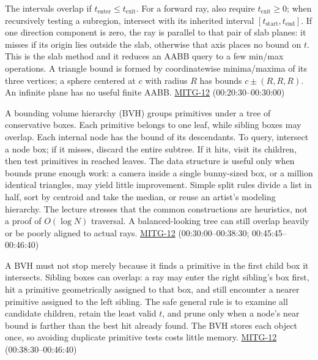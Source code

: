 The intervals overlap if \(t_{\mathrm{enter}}\leq t_{\mathrm{exit}}\). For a forward ray, also require \(t_{\mathrm{exit}}\geq0\); when recursively testing a subregion, intersect with its inherited interval \([t_{\mathrm{start}},t_{\mathrm{end}}]\). If one direction component is zero, the ray is parallel to that pair of slab planes: it misses if its origin lies outside the slab, otherwise that axis places no bound on \(t\). This is the slab method and it reduces an AABB query to a few min/max operations. A triangle bound is formed by coordinatewise minima/maxima of its three vertices; a sphere centered at \(c\) with radius \(R\) has bounds \(c\pm(R,R,R)\). An infinite plane has no useful finite AABB. \hyperref[04-visual-computing-ii-ch036]{MITG-12} (00:20:30--00:30:00)

A bounding volume hierarchy (BVH) groups primitives under a tree of conservative boxes. Each primitive belongs to one leaf, while sibling boxes may overlap. Each internal node has the bound of its descendants. To query, intersect a node box; if it misses, discard the entire subtree. If it hits, visit its children, then test primitives in reached leaves. The data structure is useful only when bounds prune enough work: a camera inside a single bunny-sized box, or a million identical triangles, may yield little improvement. Simple split rules divide a list in half, sort by centroid and take the median, or reuse an artist's modeling hierarchy. The lecture stresses that the common constructions are heuristics, not a proof of \(O(\log N)\) traversal. A balanced-looking tree can still overlap heavily or be poorly aligned to actual rays. \hyperref[04-visual-computing-ii-ch036]{MITG-12} (00:30:00--00:38:30; 00:45:45--00:46:40)

A BVH must not stop merely because it finds a primitive in the first child box it intersects. Sibling boxes can overlap: a ray may enter the right sibling's box first, hit a primitive geometrically assigned to that box, and still encounter a nearer primitive assigned to the left sibling. The safe general rule is to examine all candidate children, retain the least valid \(t\), and prune only when a node's near bound is farther than the best hit already found. The BVH stores each object once, so avoiding duplicate primitive tests costs little memory. \hyperref[04-visual-computing-ii-ch036]{MITG-12} (00:38:30--00:46:40)

